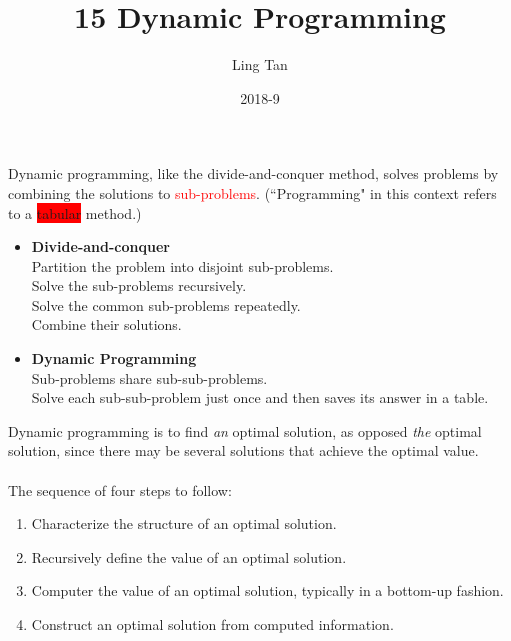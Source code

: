 \documentclass[a4paper]{article}
\title{15 Dynamic Programming}
\author{Ling Tan}
\date{2018-9}
\begin{document}
\maketitle

Dynamic programming, like the divide-and-conquer method, solves problems by combining the solutions to \textcolor{red}{sub-problems}. (``Programming" in this context refers to a \colorbox{red}{tabular} method.)
\begin{itemize}
    \item \textbf{Divide-and-conquer}\\
    Partition the problem into disjoint sub-problems.\\
    Solve the sub-problems recursively.\\
    Solve the common sub-problems repeatedly.\\
    Combine their solutions.
    \item \textbf{Dynamic Programming}\\
    Sub-problems share sub-sub-problems.\\
    Solve each sub-sub-problem just once and then saves its answer in a table.
\end{itemize}
Dynamic programming is to find \textit{an} optimal solution, as opposed \textit{the} optimal solution, since there may be several solutions that achieve the optimal value. 
\\
\\
The sequence of four steps to follow:
\begin{enumerate}
    \item Characterize the structure of an optimal solution.
    \item Recursively define the value of an optimal solution.
    \item Computer the value of an optimal solution, typically in a bottom-up fashion.
    \item Construct an optimal solution from computed information.
\end{enumerate}
\end{document}
